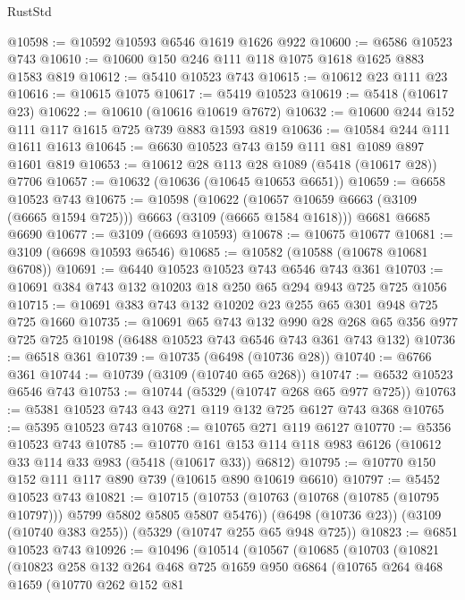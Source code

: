 \begin{lexlean}{RustStd}
\begin{coremodule}
@10598 := @10592 @10593 @6546 @1619 @1626 @922
@10600 := @6586 @10523 @743
@10610 := @10600 @150 @246 @111 @118 @1075 @1618 @1625 @883 @1583 @819
@10612 := @5410 @10523 @743
@10615 := @10612 @23 @111 @23
@10616 := @10615 @1075
@10617 := @5419 @10523
@10619 := @5418 (@10617 @23)
@10622 := @10610 (@10616 @10619 @7672)
@10632 := @10600 @244 @152 @111 @117 @1615 @725 @739 @883 @1593 @819
@10636 := @10584 @244 @111 @1611 @1613
@10645 := @6630 @10523 @743 @159 @111 @81 @1089 @897 @1601 @819
@10653 := @10612 @28 @113 @28 @1089 (@5418 (@10617 @28)) @7706
@10657 := @10632 (@10636 (@10645 @10653 @6651))
@10659 := @6658 @10523 @743
@10675 := @10598
    (@10622 (@10657 @10659 @6663 (@3109 (@6665 @1594 @725))) @6663 (@3109 (@6665 @1584 @1618)))
    @6681
    @6685
    @6690
@10677 := @3109 (@6693 @10593)
@10678 := @10675 @10677
@10681 := @3109 (@6698 @10593 @6546)
@10685 := @10582 (@10588 (@10678 @10681 @6708))
@10691 := @6440 @10523 @10523 @743 @6546 @743 @361
@10703 := @10691 @384 @743 @132 @10203 @18 @250 @65 @294 @943 @725 @725 @1056
@10715 := @10691 @383 @743 @132 @10202 @23 @255 @65 @301 @948 @725 @725 @1660
@10735 := @10691
    @65
    @743
    @132
    @990
    @28
    @268
    @65
    @356
    @977
    @725
    @725
    @10198
    (@6488 @10523 @743 @6546 @743 @361 @743 @132)
@10736 := @6518 @361
@10739 := @10735 (@6498 (@10736 @28))
@10740 := @6766 @361
@10744 := @10739 (@3109 (@10740 @65 @268))
@10747 := @6532 @10523 @6546 @743
@10753 := @10744 (@5329 (@10747 @268 @65 @977 @725))
@10763 := @5381 @10523 @743 @43 @271 @119 @132 @725 @6127 @743 @368
@10765 := @5395 @10523 @743
@10768 := @10765 @271 @119 @6127
@10770 := @5356 @10523 @743
@10785 := @10770
    @161
    @153
    @114
    @118
    @983
    @6126
    (@10612 @33 @114 @33 @983 (@5418 (@10617 @33)) @6812)
@10795 := @10770 @150 @152 @111 @117 @890 @739 (@10615 @890 @10619 @6610)
@10797 := @5452 @10523 @743
@10821 := @10715
    (@10753 (@10763 (@10768 (@10785 (@10795 @10797))) @5799 @5802 @5805 @5807 @5476))
    (@6498 (@10736 @23))
    (@3109 (@10740 @383 @255))
    (@5329 (@10747 @255 @65 @948 @725))
@10823 := @6851 @10523 @743
@10926 := @10496
    (@10514
      (@10567
        (@10685
          (@10703
            (@10821
              (@10823
                @258
                @132
                @264
                @468
                @725
                @1659
                @950
                @6864
                (@10765
                  @264
                  @468
                  @1659
                  (@10770
                    @262
                    @152
                    @81

\end{coremodule}
\end{lexlean}
